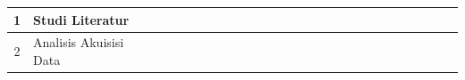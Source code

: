 \begin{table}[H]
{\begin{tabular}{|c|l|llll|llll|llll|llll|llll|llll|}
  1                    & Studi Literatur                                 & \multicolumn{1}{l|}{\cellcolor[HTML]{656565}} & \multicolumn{1}{l|}{\cellcolor[HTML]{656565}} & \multicolumn{1}{l|}{\cellcolor[HTML]{656565}} & \cellcolor[HTML]{656565} & \multicolumn{1}{l|}{\cellcolor[HTML]{656565}} & \multicolumn{1}{l|}{\cellcolor[HTML]{656565}} & \multicolumn{1}{l|}{\cellcolor[HTML]{656565}} & \cellcolor[HTML]{656565} & \multicolumn{1}{l|}{\cellcolor[HTML]{656565}} & \multicolumn{1}{l|}{\cellcolor[HTML]{656565}} & \multicolumn{1}{l|}{\cellcolor[HTML]{656565}} & \cellcolor[HTML]{656565} & \multicolumn{1}{l|}{}                                                & \multicolumn{1}{l|}{}                                                & \multicolumn{1}{l|}{}                         &                          & \multicolumn{1}{l|}{}                         & \multicolumn{1}{l|}{}                         & \multicolumn{1}{l|}{}                         &                          & \multicolumn{1}{l|}{}                         & \multicolumn{1}{l|}{}                         & \multicolumn{1}{l|}{}                         &                          \\ \hline
  2                    & Analisis Akuisisi Data                                & \multicolumn{1}{l|}{}                         & \multicolumn{1}{l|}{}                         & \multicolumn{1}{l|}{}                         & & \multicolumn{1}{l|}{\cellcolor[HTML]{656565}} & \multicolumn{1}{l|}{\cellcolor[HTML]{656565}}                         & \multicolumn{1}{l|}{\cellcolor[HTML]{656565}}                         &                          \cellcolor[HTML]{656565}& \multicolumn{1}{l|}{\cellcolor[HTML]{656565}} & \multicolumn{1}{l|}{\cellcolor[HTML]{656565}}                         & \multicolumn{1}{l|}{\cellcolor[HTML]{656565}}                         &                          \cellcolor[HTML]{656565}& \multicolumn{1}{l|}{\cellcolor[HTML]{656565}}                                                & \multicolumn{1}{l|}{}                                                & \multicolumn{1}{l|}{}                         &                          & \multicolumn{1}{l|}{}                         & \multicolumn{1}{l|}{}                         & \multicolumn{1}{l|}{}                         &                          & \multicolumn{1}{l|}{}                         & \multicolumn{1}{l|}{}                         & \multicolumn{1}{l|}{}                         &                          \\ \hline

\end{tabular}}
\end{table}
